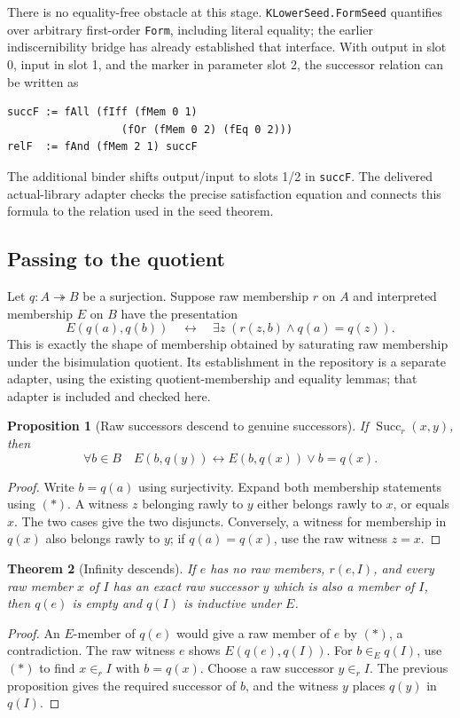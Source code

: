 \documentclass[11pt,letterpaper]{article}
\newtheorem{theorem}{Theorem}[section]
\newtheorem{proposition}[theorem]{Proposition}
\theoremstyle{definition}\newtheorem{definition}[theorem]{Definition}
\newcommand{\Succ}{\operatorname{Succ}}
\newcommand{\code}[1]{\texttt{#1}}
\begin{document}
There is no equality-free obstacle at this stage. \code{KLowerSeed.FormSeed}
quantifies over arbitrary first-order \code{Form}, including literal equality;
the earlier indiscernibility bridge has already established that interface.
With output in slot 0, input in slot 1, and the marker in parameter slot 2, the
successor relation can be written as
\begin{lstlisting}
succF := fAll (fIff (fMem 0 1)
                  (fOr (fMem 0 2) (fEq 0 2)))
relF  := fAnd (fMem 2 1) succF
\end{lstlisting}
The additional binder shifts output/input to slots 1/2 in \code{succF}. The
delivered actual-library adapter checks the precise satisfaction equation and
connects this formula to the relation used in the seed theorem.

\subsection{Passing to the quotient}

Let $q:A\twoheadrightarrow B$ be a surjection. Suppose raw membership $r$ on $A$
and interpreted membership $E$ on $B$ have the presentation
\[
 E(q(a),q(b))\quad\longleftrightarrow\quad
 \exists z\;(r(z,b)\land q(a)=q(z)). \tag{*}
\]
This is exactly the shape of membership obtained by saturating raw membership
under the bisimulation quotient. Its establishment in the repository is a
separate adapter, using the existing quotient-membership and equality lemmas;
that adapter is included and checked here.

\begin{proposition}[Raw successors descend to genuine successors]
If $\Succ_r(x,y)$, then
\[
 \forall b\in B\quad
 E(b,q(y))\longleftrightarrow E(b,q(x))\lor b=q(x).
\]
\end{proposition}
\begin{proof}
Write $b=q(a)$ using surjectivity. Expand both membership statements using $(*)$.
A witness $z$ belonging rawly to $y$ either belongs rawly to $x$, or equals $x$.
The two cases give the two disjuncts. Conversely, a witness for membership in
$q(x)$ also belongs rawly to $y$; if $q(a)=q(x)$, use the raw witness $z=x$.
\end{proof}

\begin{theorem}[Infinity descends]
If $e$ has no raw members, $r(e,I)$, and every raw member $x$ of $I$ has an exact
raw successor $y$ which is also a member of $I$, then $q(e)$ is empty and $q(I)$
is inductive under $E$.
\end{theorem}
\begin{proof}
An $E$-member of $q(e)$ would give a raw member of $e$ by $(*)$, a contradiction.
The raw witness $e$ shows $E(q(e),q(I))$. For $b\in_E q(I)$, use $(*)$ to find
$x\in_r I$ with $b=q(x)$. Choose a raw successor $y\in_r I$. The previous
proposition gives the required successor of $b$, and the witness $y$ places
$q(y)$ in $q(I)$.
\end{proof}
\end{document}
